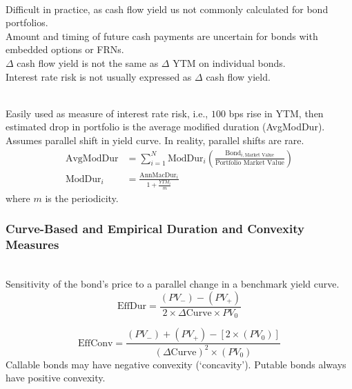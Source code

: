 \begin{definition} \\
Difficult in practice, as cash flow yield us not commonly calculated for bond portfolios.\\
Amount and timing of future cash payments are uncertain for bonds with embedded options or FRNs.\\
$\Delta$ cash flow yield is not the same as $\Delta$ YTM on individual bonds.\\
Interest rate risk is not usually expressed as $\Delta$ cash flow yield.
\end{definition}

\begin{definition} \\
Easily used as measure of interest rate risk, i.e., $100$ bps rise in YTM, then estimated drop in portfolio is the average modified duration (AvgModDur).\\
Assumes parallel shift in yield curve. In reality, parallel shifts are rare.
\begin{align}
\text{AvgModDur} &= \sum\limits_{i=1}^N \text{ModDur}_i \left( \frac{\text{Bond}_{i, \text{Market Value}}}{\text{Portfolio Market Value}} \right) \nonumber \\
\text{ModDur}_i &= \frac{\text{AnnMacDur}_i}{1 + \frac{YTM_i}{m}} \nonumber
\end{align}
where $m$ is the periodicity.
\end{definition}

\subsubsection{Curve-Based and Empirical Duration and Convexity Measures}

\begin{definition} \\
Sensitivity of the bond’s price to a parallel change in a benchmark yield curve.
\begin{equation}
\text{EffDur} = \frac{(PV_{-}) - (PV_{+})}{2 \times \Delta \text{Curve} \times PV_0} \nonumber
\end{equation}
\end{definition}

\begin{definition} 
\begin{equation}
\text{EffConv} = \frac{(PV_{-}) + (PV_{+}) - [2 \times (PV_0)]}{(\Delta \text{Curve})^2 \times (PV_0)} \nonumber
\end{equation}
Callable bonds may have negative convexity (‘concavity’). Putable bonds always have positive convexity.
\end{definition}

